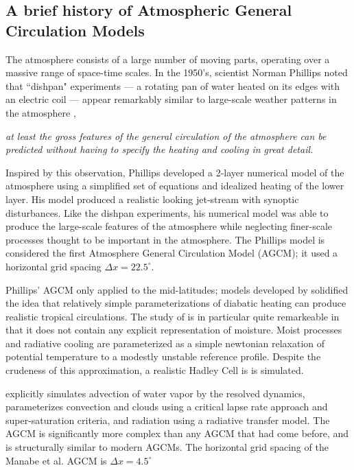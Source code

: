 \subsection{A brief history of Atmospheric General Circulation Models}

The atmosphere consists of a large number of moving parts, operating over a massive range of space-time scales. In the 1950's, scientist Norman Phillips noted that  ``dishpan" experiments --- a rotating pan of water heated on its edges with an electric coil --- appear remarkably similar to large-scale weather patterns in the atmosphere \citep{WEART2008},
\begin{displayquote}
{\em{at least the gross features of the general circulation of the atmosphere can be predicted without having to specify the heating and cooling in great detail.}}
\end{displayquote}
Inspired by this observation, Phillips developed a 2-layer numerical model of the atmosphere using a simplified set of equations and idealized heating of the lower layer. His model produced a realistic looking jet-stream with synoptic disturbances. Like the dishpan experiments, his numerical model was able to produce the large-scale features of the atmosphere while neglecting finer-scale processes thought to be important in the atmosphere. The Phillips model is considered the first Atmosphere General Circulation Model (AGCM); it used a horizontal grid spacing $\Delta x = 22.5^{\circ}$.

Phillips' AGCM only applied to the mid-latitudes; models developed by \cite{METAL1965MWR, HH1980JAS} solidified the idea that relatively simple parameterizations of diabatic heating can produce realistic tropical circulations. The study of \citep{HH1980JAS} is in particular quite remarkeable in that it does not contain any explicit representation of moisture. Moist processes and radiative cooling are parameterized as a simple newtonian relaxation of potential temperature to a modestly unstable reference profile. Despite the crudeness of this approximation, a realistic Hadley Cell is is simulated. 

\cite{METAL1965MWR} explicitly simulates advection of water vapor by the resolved dynamics, parameterizes convection and clouds using a critical lapse rate approach and super-saturation criteria, and radiation using a radiative transfer model. The \cite{METAL1965MWR} AGCM is significantly more complex than any AGCM that had come before, and is structurally similar to modern AGCMs. The horizontal grid spacing of the Manabe et al. AGCM is $\Delta x = 4.5^{\circ}$

